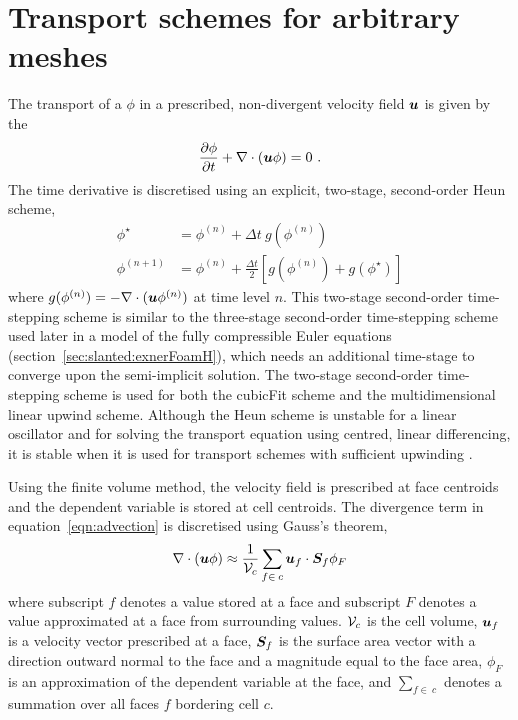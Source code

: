 \section{Transport schemes for arbitrary meshes}
\label{sec:cubicFit:transport}

The transport of a  $\phi$ in a prescribed, non-divergent velocity field $\bm{u}$ is given by the 
\begin{align}		
	\frac{\partial \phi}{\partial t} + \nabla \cdot \left( \bm{u} \phi \right) = 0 \text{ .} \label{eqn:advection}		
\end{align}
The time derivative is discretised using an explicit, two-stage, second-order Heun scheme,
\begin{subequations}
\begin{align}
	\phi^\star &= \phi^{(n)} + \Delta t \: g(\phi^{(n)}) \\
	\phi^{(n+1)} &= \phi^{(n)} + \frac{\Delta t}{2} \left[ g(\phi^{(n)}) + g(\phi^{\star}) \right]
\end{align} \label{eqn:heun}%
\end{subequations}
\unskip where \(g(\phi^{(n)}) = - \nabla \cdot (\bm{u} \phi^{(n)})\) at time level \(n\).
This two-stage second-order time-stepping scheme is similar to the three-stage second-order time-stepping scheme used later in a model of the fully compressible Euler equations (section~\ref{sec:slanted:exnerFoamH}), which needs an additional time-stage to converge upon the semi-implicit solution.
The two-stage second-order time-stepping scheme is used for both the cubicFit scheme and the multidimensional linear upwind scheme.
Although the Heun scheme is unstable for a linear oscillator \citep{durran2013} and for solving the transport equation using centred, linear differencing, it is stable when it is used for transport schemes with sufficient upwinding \citep[p. 149]{hundsdorfer-verwer2013}.

Using the finite volume method, the velocity field is prescribed at face centroids and the dependent variable is stored at cell centroids.  The divergence term in equation~\eqref{eqn:advection} is discretised using Gauss's theorem,
\begin{align}
	\nabla \cdot \left( \bm{u} \phi \right) \approx \frac{1}{\mathcal{V}_c} \sum_{f \in\:c} \bm{u}_f \cdot \bm{S}_f \phi_F \label{eqn:gauss-div}
\end{align}
where subscript $f$ denotes a value stored at a face and subscript $F$ denotes a value approximated at a face from surrounding values.  $\mathcal{V}_c$ is the cell volume, $\bm{u}_f$ is a velocity vector prescribed at a face, $\bm{S}_f$ is the surface area vector with a direction outward normal to the face and a magnitude equal to the face area, $\phi_F$ is an approximation of the dependent variable at the face, and $\sum_{f \in\:c}$ denotes a summation over all faces $f$ bordering cell $c$.

